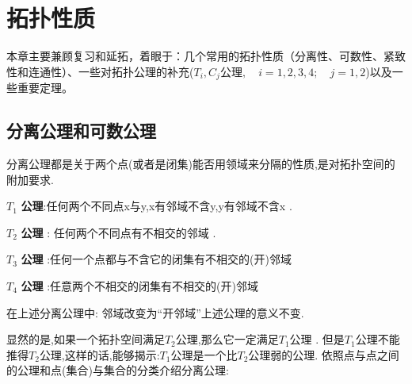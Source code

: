 \chapter{拓扑性质}
本章主要兼顾复习和延拓，着眼于：几个常用的拓扑性质（分离性、可数性、紧致性和连通性）、一些对拓扑公理的补充(\(T_i,C_j \text{公理},\quad i=1,2,3,4 ; \quad j=1,2 \))以及一些重要定理。
\section{分离公理和可数公理}
分离公理都是关于两个点(或者是闭集)能否用领域来分隔的性质,是对拓扑空间的附加要求.
\begin{definition}
    \(T_1\) \textbf{公理}:任何两个不同点x与y,x有邻域不含y,y有邻域不含x . 
\end{definition}
\begin{definition}
    \(T_2\) \textbf{公理} : 任何两个不同点有不相交的邻域 .
\end{definition}
\begin{definition}
     \(T_3\) \textbf{公理} :任何一个点都与不含它的闭集有不相交的(开)邻域
\end{definition}
\begin{definition}
     \(T_4\) \textbf{公理} :任意两个不相交的闭集有不相交的(开)邻域
\end{definition}
\begin{note}
    在上述分离公理中: 邻域改变为“开邻域”上述公理的意义不变.
\end{note}
显然的是,如果一个拓扑空间满足\(T_2\)公理,那么它一定满足\(T_1\)公理 . 但是\(T_1\)公理不能推得\(T_2\)公理,这样的话,能够揭示:\(T_1\)公理是一个比\(T_2\)公理弱的公理.
依照点与点之间的公理和点(集合)与集合的分类介绍分离公理:
